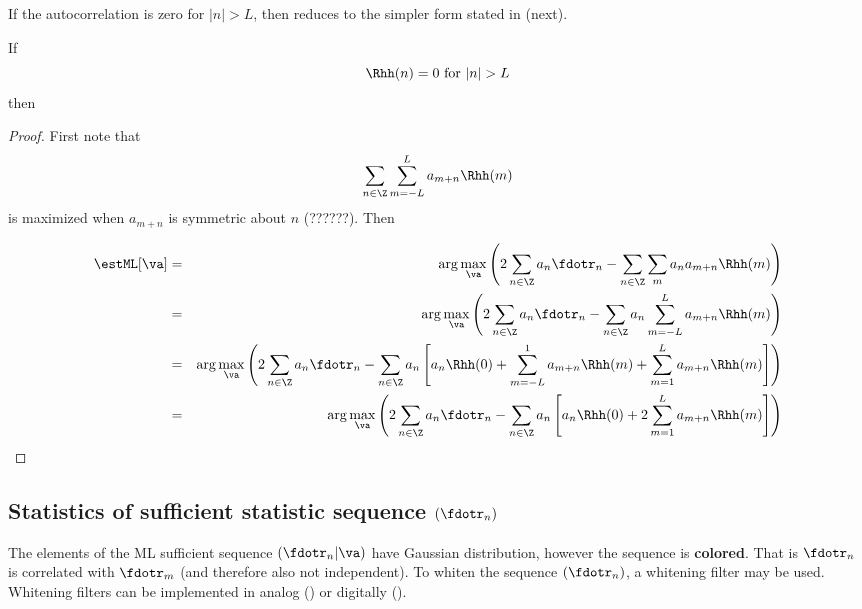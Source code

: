 If the autocorrelation is zero for $|n|>L$, then
 reduces to the simpler form
stated in  (next).
\begin{corollary}
\label{cor:eq-ml}
If
   \[ \Rhh(n) = 0 \mbox{ for } |n|>L \]
then

\end{corollary}
\begin{proof}
First note that
   \[ \sum_{n\in\Z} \sum_{m=-L}^L a_{m+n} \Rhh(m) \]
is maximized when $a_{m+n}$ is symmetric about $n$ (??????). \attention
Then

\begin{eqnarray*}
   \estML[\va ]
     &=&    \arg\max_\va
            \left(
             2\sum_{n\in\Z} a_n \fdotr_n
            -\sum_{n\in\Z}\sum_m a_n a_{m+n} \Rhh(m)
            \right)
   \\&=&    \arg\max_\va
            \left(
             2\sum_{n\in\Z} a_n \fdotr_n
            -\sum_{n\in\Z} a_n \sum_{m=-L}^L a_{m+n} \Rhh(m)
            \right)
   \\&=&    \arg\max_\va
            \left(
             2\sum_{n\in\Z} a_n \fdotr_n -\sum_{n\in\Z} a_n
             \left[
                a_n \Rhh(0) +
                \sum_{m=-L}^1 a_{m+n} \Rhh(m) +
                \sum_{m=1}^L a_{m+n} \Rhh(m)
            \right]
            \right)
   \\&=&    \arg\max_\va
            \left(
             2\sum_{n\in\Z} a_n \fdotr_n -\sum_{n\in\Z} a_n
             \left[
                a_n \Rhh(0) +
                2\sum_{m=1}^L a_{m+n} \Rhh(m)
            \right]
            \right)
\end{eqnarray*}
\end{proof}


\subsection{Statistics of sufficient statistic sequence $(\fdotr_n)$}
The elements of the ML sufficient sequence $(\fdotr_n|\va )$ have
Gaussian distribution, however the sequence is {\bf colored}.
That is $\fdotr_n$ is correlated
with $\fdotr_m$ (and therefore also not independent).
To whiten the sequence $(\fdotr_n)$, a whitening filter may be used.
Whitening filters can be implemented in
analog () or digitally ().

